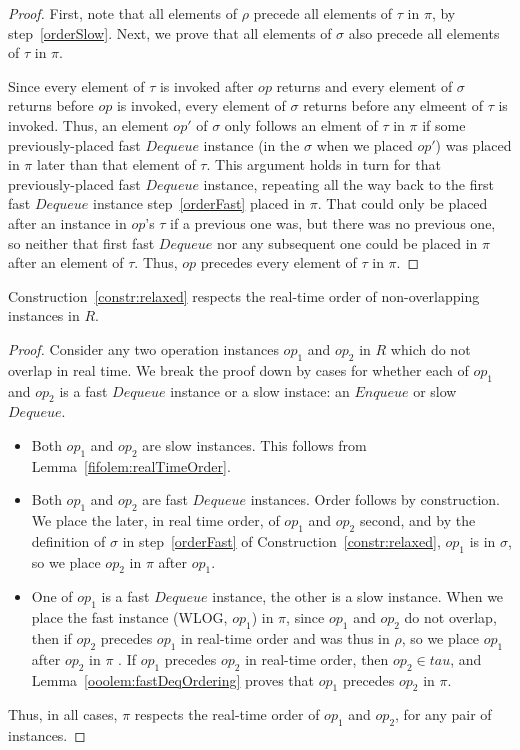 \documentclass[a4paper,anonymous,USenglish]{lipics-v2021}
\theoremstyle{definition}
\begin{document}
\begin{proof}
  First, note that all elements of $\rho$ precede all elements of $\tau$ in $\pi$, by step~\ref{orderSlow}.  Next, we prove that all elements of $\sigma$ also precede all elements of $\tau$ in $\pi$.

  Since every element of $\tau$ is invoked after $op$ returns and every element of $\sigma$ returns before $op$ is invoked, every element of $\sigma$ returns before any elmeent of $\tau$ is invoked.  Thus, an element $op'$ of $\sigma$ only follows an elment of $\tau$ in $\pi$ if some previously-placed fast $Dequeue$ instance (in the $\sigma$ when we placed $op'$) was placed in $\pi$ later than that element of $\tau$.  This argument holds in turn for that previously-placed fast $Dequeue$ instance, repeating all the way back to the first fast $Dequeue$ instance step~\ref{orderFast} placed in $\pi$.  That could only be placed after an instance in $op$'s $\tau$ if a previous one was, but there was no previous one, so neither that first fast $Dequeue$ nor any subsequent one could be placed in $\pi$ after an element of $\tau$.  Thus, $op$ precedes every element of $\tau$ in $\pi$.
\end{proof}

\begin{lemma}
  Construction~\ref{constr:relaxed} respects the real-time order of non-overlapping instances in $R$.
\end{lemma}

\begin{proof}
  Consider any two operation instances $op_1$ and $op_2$ in $R$ which do not overlap in real time.  We break the proof down by cases for whether each of $op_1$ and $op_2$ is a fast $Dequeue$ instance or a slow instace: an $Enqueue$ or slow $Dequeue$.
  \begin{itemize}
  \item Both $op_1$ and $op_2$ are slow instances.  This follows from Lemma~\ref{fifolem:realTimeOrder}.
  \item Both $op_1$ and $op_2$ are fast $Dequeue$ instances.  Order follows by construction.  We place the later, in real time order, of $op_1$ and $op_2$ second, and by the definition of $\sigma$ in step~\ref{orderFast} of Construction~\ref{constr:relaxed}, $op_1$ is in $\sigma$, so we place $op_2$ in $\pi$ after $op_1$.
  \item One of $op_1$ is a fast $Dequeue$ instance, the other is a slow instance.  When we place the fast instance (WLOG, $op_1$) in $\pi$, since $op_1$ and $op_2$ do not overlap, then if $op_2$ precedes $op_1$ in real-time order and was thus in $\rho$, so we place $op_1$ after $op_2$ in $\pi$ .  If $op_1$ precedes $op_2$ in real-time order, then $op_2 \in tau$, and Lemma~\ref{ooolem:fastDeqOrdering} proves that $op_1$ precedes $op_2$ in $\pi$.
  \end{itemize}

  Thus, in all cases, $\pi$ respects the real-time order of $op_1$ and $op_2$, for any pair of instances.
\end{proof}
\end{document}

